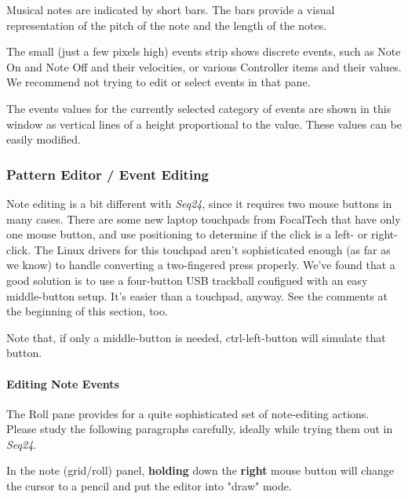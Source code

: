    Musical notes are indicated by short bars.  The bars provide a visual
   representation of the pitch of the note and the length of the notes.

   The small (just a few pixels high) events strip shows discrete events,
   such as Note On and Note Off and their velocities, or various Controller
   items and their values.  We recommend not trying to edit or select events
   in that pane.

   The events values for the currently selected category of events are shown
   in this window as vertical lines of a height proportional to the value.
   These values can be easily modified.

\subsubsection{Pattern Editor / Event Editing}
\label{subsubsec:seq24_pattern_editor_event_editing}

   Note editing is a bit different with \textsl{Seq24}, since it
   requires two mouse buttons in many cases.  There are some new
   laptop touchpads from FocalTech that have only one mouse button, and
   use positioning to determine if the click is a left- or right-click.
   The Linux drivers for this touchpad aren't sophisticated enough (as far
   as we know) to handle converting a two-fingered press properly.
   We've found that a good solution is to use a four-button USB trackball
   configued with an easy middle-button setup.
   It's easier than a touchpad, anyway.
   See the comments at the beginning of this section, too.

   Note that, if only a middle-button is needed, ctrl-left-button will
   simulate that button.

\paragraph{Editing Note Events}
\label{paragraph:seq24_pattern_editor_note_events}

   The Roll pane provides for a quite sophisticated set of note-editing
   actions.  Please study the following paragraphs carefully, ideally while
   trying them out in \textsl{Seq24}.

	In the note (grid/roll) panel, \textbf{holding}
	down the \textbf{right} mouse button will change the cursor
	to a pencil and put the editor into "draw" mode.
   
